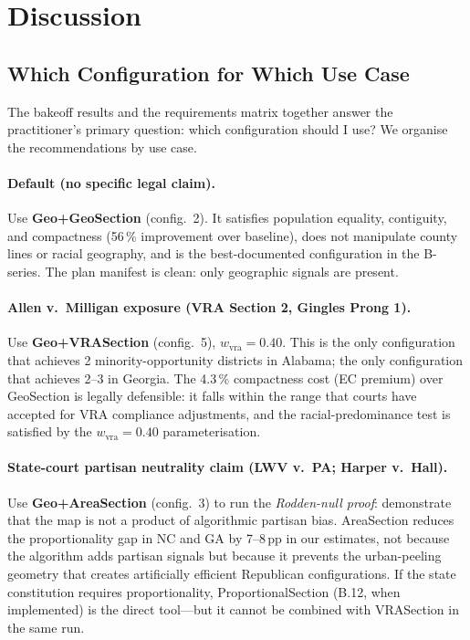 \section{Discussion}
\label{sec:discussion}

\subsection{Which Configuration for Which Use Case}

The bakeoff results and the requirements matrix together answer the practitioner's
primary question: which configuration should I use?
We organise the recommendations by use case.

\paragraph{Default (no specific legal claim).}
Use \textbf{Geo+GeoSection} (config.~2).
It satisfies population equality, contiguity, and compactness (56\,\% improvement
over baseline), does not manipulate county lines or racial geography, and is
the best-documented configuration in the B-series.
The plan manifest is clean: only geographic signals are present.

\paragraph{Allen v.\ Milligan exposure (VRA Section 2, Gingles Prong 1).}
Use \textbf{Geo+VRASection} (config.~5), $w_\text{vra} = 0.40$.
This is the only configuration that achieves 2 minority-opportunity districts in
Alabama; the only configuration that achieves 2--3 in Georgia.
The 4.3\,\% compactness cost (EC premium) over GeoSection is legally defensible:
it falls within the range that courts have accepted for VRA compliance adjustments,
and the \miller{} racial-predominance test is satisfied by the $w_\text{vra} = 0.40$
parameterisation.

\paragraph{State-court partisan neutrality claim (LWV v.\ PA; Harper v.\ Hall).}
Use \textbf{Geo+AreaSection} (config.~3) to run the \emph{Rodden-null proof}:
demonstrate that the map is not a product of algorithmic partisan bias.
AreaSection reduces the proportionality gap in NC and GA by 7--8\,pp in our
estimates, not because the algorithm adds partisan signals but because it
prevents the urban-peeling geometry that creates artificially efficient Republican
configurations.
If the state constitution requires proportionality, ProportionalSection (B.12,
when implemented) is the direct tool---but it cannot be combined with VRASection
in the same run.

